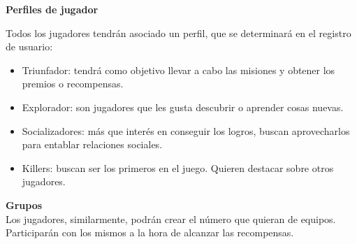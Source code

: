 \documentclass[twoside]{report}
\begin{document}
\textbf{Perfiles de jugador}\\ \cite{iebsctj}

Todos los jugadores tendrán asociado un perfil, que se determinará en el registro de usuario:
\begin{itemize}

\item Triunfador: tendrá como objetivo llevar a cabo las misiones y obtener los premios o recompensas.
\item Explorador: son jugadores que les gusta descubrir o aprender cosas nuevas.
\item Socializadores: más que interés en conseguir los logros, buscan aprovecharlos para entablar relaciones sociales.
\item Killers: buscan ser los primeros en el juego. Quieren destacar sobre otros jugadores.

\end{itemize}

\textbf{Grupos}\\

Los jugadores, similarmente, podrán crear el número que quieran de equipos. Participarán con los mismos a la hora de alcanzar las recompensas.
\end{document}
